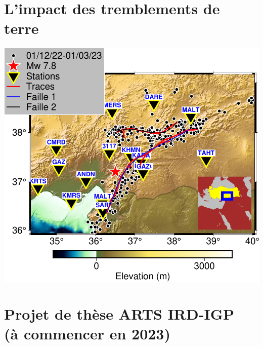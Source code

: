 \documentclass{beamer}
\begin{document}
\section{L'impact des tremblements de terre}

\begin{frame}
 
 \begin{minipage}{0.45\linewidth}
  \includegraphics[width=1.5\linewidth]{images/Map_Turkey}
 \end{minipage}

 
\end{frame}


\section{Projet de thèse ARTS IRD-IGP \\ (à commencer en 2023)}
\end{document}
